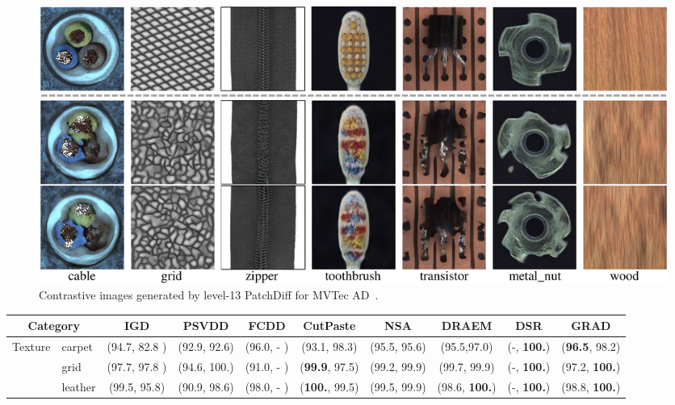 \begin{figure}[!h]
    \centering
\includegraphics[width=0.7\linewidth]{images/mvtec_generation_results.pdf}
    \caption{Contrastive images generated by level-13 PatchDiff for MVTec AD~\cite{MVTecAD}. } 
    \label{fig: mvtec_generation}
\end{figure}

\begin{table}[!h]
    \centering
    \renewcommand{\arraystretch}{1.2}
    \resizebox{\textwidth}{!}
    {
\begin{tabular}{cl|c|c|c|c|c|c|c|c}
\toprule
\multicolumn{2}{c|}{Category}     & IGD & PSVDD & FCDD & CutPaste &NSA & DRAEM & DSR & GRAD \\ \midrule
\multirow{5}{*}{Texture} 
& carpet & (94.7, 82.8 ) & (92.9, 92.6) & (96.0, - ) & (93.1, 98.3) & (95.5, 95.6) & (95.5,97.0) & (-, \textbf{100.}) & (\textbf{96.5}, 98.2) \\
& grid & (97.7, 97.8 ) & (94.6, 100.) & (91.0, - ) & (\textbf{99.9}, 97.5) & (99.2, 99.9) & (99.7, 99.9) & (-, \textbf{100.}) & (97.2, \textbf{100.}) \\
& leather & (99.5, 95.8) & (90.9, 98.6) & (98.0, - ) & (\textbf{100.}, 99.5) & (99.5, 99.9) & (98.6, \textbf{100.}) & (-, \textbf{100.}) & (98.8, \textbf{100.}) \\

\end{tabular}}
\end{table}
